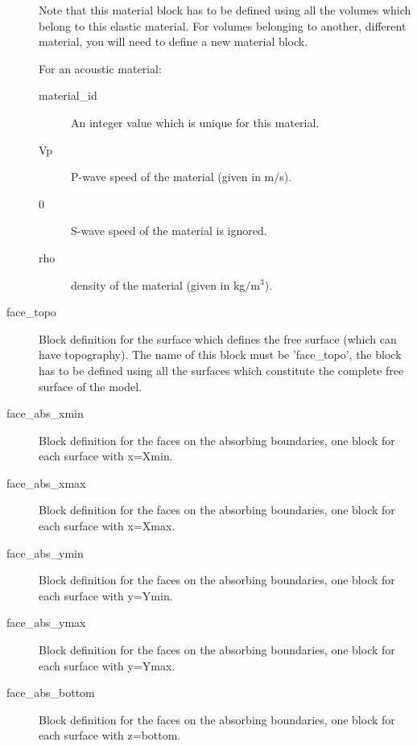 \begin{description}
Note that this material block has to be defined using all the volumes
which belong to this elastic material. For volumes belonging to another,
different material, you will need to define a new material block.


For an acoustic material:
\begin{description}
\item [{material\_id}] An integer value which is unique for this material.
\item [{Vp}] P-wave speed of the material (given in m/s).
\item [{0}] S-wave speed of the material is ignored.
\item [{rho}] density of the material (given in kg/m$^{3}$).
\end{description}
\item [{face\_topo}] Block definition for the surface which defines the
free surface (which can have topography). The name of this block must
be 'face\_topo', the block has to be defined using all the surfaces
which constitute the complete free surface of the model.
\item [{face\_abs\_xmin}] Block definition for the faces on the absorbing
boundaries, one block for each surface with x=Xmin.
\item [{face\_abs\_xmax}] Block definition for the faces on the absorbing
boundaries, one block for each surface with x=Xmax.
\item [{face\_abs\_ymin}] Block definition for the faces on the absorbing
boundaries, one block for each surface with y=Ymin.
\item [{face\_abs\_ymax}] Block definition for the faces on the absorbing
boundaries, one block for each surface with y=Ymax.
\item [{face\_abs\_bottom}] Block definition for the faces on the absorbing
boundaries, one block for each surface with z=bottom.
\end{description}
%
